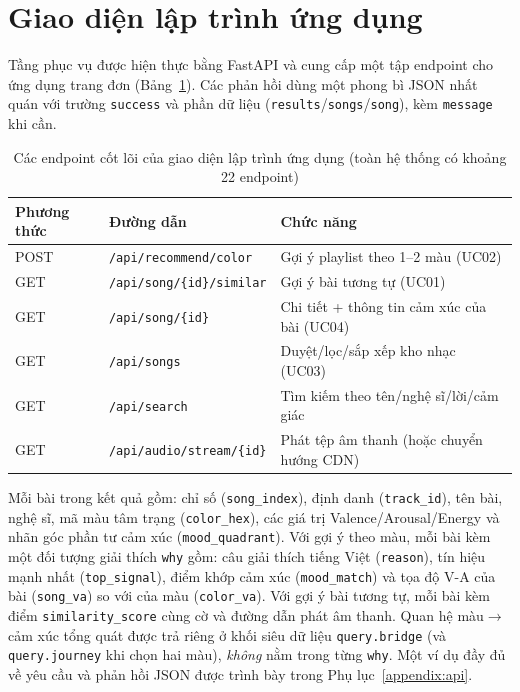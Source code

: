 \documentclass[../DoAn.tex]{subfiles}
\begin{document}
\section{Giao diện lập trình ứng dụng}
\label{section:api}
Tầng phục vụ được hiện thực bằng FastAPI và cung cấp một tập endpoint cho ứng dụng trang đơn (Bảng~\ref{table:api}). Các phản hồi dùng một phong bì JSON nhất quán với trường \texttt{success} và phần dữ liệu (\texttt{results}/\texttt{songs}/\texttt{song}), kèm \texttt{message} khi cần.

\begin{table}[h!]
\centering
\caption{Các endpoint cốt lõi của giao diện lập trình ứng dụng (toàn hệ thống có khoảng 22 endpoint)}
\label{table:api}
\begin{tabular}{p{1.8cm} p{5.8cm} p{6.0cm}}
\toprule
\textbf{Phương thức} & \textbf{Đường dẫn} & \textbf{Chức năng} \\
\midrule
POST & \texttt{/api/recommend/color} & Gợi ý playlist theo 1--2 màu (UC02) \\
GET & \texttt{/api/song/\{id\}/similar} & Gợi ý bài tương tự (UC01) \\
GET & \texttt{/api/song/\{id\}} & Chi tiết + thông tin cảm xúc của bài (UC04) \\
GET & \texttt{/api/songs} & Duyệt/lọc/sắp xếp kho nhạc (UC03) \\
GET & \texttt{/api/search} & Tìm kiếm theo tên/nghệ sĩ/lời/cảm giác \\
GET & \texttt{/api/audio/stream/\{id\}} & Phát tệp âm thanh (hoặc chuyển hướng CDN) \\
\bottomrule
\end{tabular}
\end{table}

Mỗi bài trong kết quả gồm: chỉ số (\texttt{song\_index}), định danh (\texttt{track\_id}), tên bài, nghệ sĩ, mã màu tâm trạng (\texttt{color\_hex}), các giá trị Valence/Arousal/Energy và nhãn góc phần tư cảm xúc (\texttt{mood\_quadrant}). Với gợi ý theo màu, mỗi bài kèm một đối tượng giải thích \texttt{why} gồm: câu giải thích tiếng Việt (\texttt{reason}), tín hiệu mạnh nhất (\texttt{top\_signal}), điểm khớp cảm xúc (\texttt{mood\_match}) và tọa độ V-A của bài (\texttt{song\_va}) so với của màu (\texttt{color\_va}). Với gợi ý bài tương tự, mỗi bài kèm điểm \texttt{similarity\_score} cùng cờ và đường dẫn phát âm thanh. Quan hệ màu$\rightarrow$cảm xúc tổng quát được trả riêng ở khối siêu dữ liệu \texttt{query.bridge} (và \texttt{query.journey} khi chọn hai màu), \textit{không} nằm trong từng \texttt{why}. Một ví dụ đầy đủ về yêu cầu và phản hồi JSON được trình bày trong Phụ lục~\ref{appendix:api}.
\end{document}
